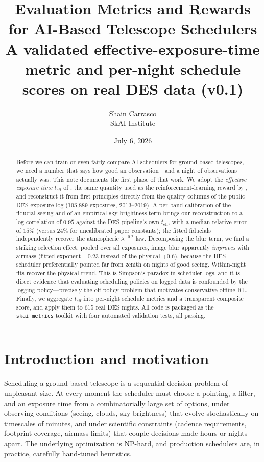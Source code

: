 \documentclass[11pt]{article}
\title{Evaluation Metrics and Rewards for AI-Based Telescope Schedulers\\
  \large A validated effective-exposure-time metric and per-night schedule scores on real DES data (v0.1)}
\author{Shain Carrasco\\ \small SkAI Institute}
\date{July 6, 2026}
\newcommand{\teff}{t_{\mathrm{eff}}}
\begin{document}
\maketitle

\begin{abstract}
Before we can train or even fairly compare AI schedulers for ground-based telescopes,
we need a number that says how good an observation---and a night of
observations---actually was. This note documents the first phase of that work. We
adopt the \emph{effective exposure time} $\teff$ of \citet{neilsen2019}, the same
quantity used as the reinforcement-learning reward by \citet{terranova2023}, and
reconstruct it from first principles directly from the quality columns of the public
DES exposure log (105{,}889 exposures, 2013--2019). A per-band calibration of the
fiducial seeing and of an empirical sky-brightness term brings our reconstruction to
a log-correlation of $0.95$ against the DES pipeline's own $\teff$, with a median
relative error of $15\%$ (versus $24\%$ for uncalibrated paper constants); the
fitted fiducials independently recover the atmospheric $\lambda^{-0.2}$ law. Decomposing
the blur term, we find a striking selection effect: pooled over all exposures, image
blur apparently \emph{improves} with airmass (fitted exponent $-0.23$ instead of the
physical $+0.6$), because the DES scheduler preferentially pointed far from zenith on
nights of good seeing. Within-night fits recover the physical trend. This is
Simpson's paradox in scheduler logs, and it is direct evidence that evaluating
scheduling policies on logged data is confounded by the logging policy---precisely the
off-policy problem that motivates conservative offline RL. Finally, we aggregate
$\teff$ into per-night schedule metrics and a transparent composite score, and apply
them to 615 real DES nights. All code is packaged as the \texttt{skai\_metrics}
toolkit with four automated validation tests, all passing.
\end{abstract}

\section{Introduction and motivation}
\label{sec:intro}

Scheduling a ground-based telescope is a sequential decision problem of unpleasant
size. At every moment the scheduler must choose a pointing, a filter, and an exposure
time from a combinatorially large set of options, under observing conditions (seeing,
clouds, sky brightness) that evolve stochastically on timescales of minutes, and under
scientific constraints (cadence requirements, footprint coverage, airmass limits) that
couple decisions made hours or nights apart. The underlying optimization is NP-hard,
and production schedulers are, in practice, carefully hand-tuned heuristics.
\end{document}
